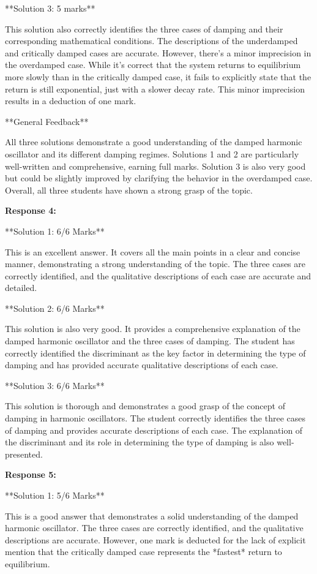 \documentclass[a4paper,11pt]{article}
\begin{document}
**Solution 3: 5 marks**

This solution also correctly identifies the three cases of damping and their corresponding mathematical conditions. The descriptions of the underdamped and critically damped cases are accurate. However, there's a minor imprecision in the overdamped case. While it's correct that the system returns to equilibrium more slowly than in the critically damped case, it fails to explicitly state that the return is still exponential, just with a slower decay rate. This minor imprecision results in a deduction of one mark.

**General Feedback**

All three solutions demonstrate a good understanding of the damped harmonic oscillator and its different damping regimes. Solutions 1 and 2 are particularly well-written and comprehensive, earning full marks. Solution 3 is also very good but could be slightly improved by clarifying the behavior in the overdamped case. Overall, all three students have shown a strong grasp of the topic.

\textbf{Response 4:}

**Solution 1: 6/6 Marks**

This is an excellent answer. It covers all the main points in a clear and concise manner, demonstrating a strong understanding of the topic. The three cases are correctly identified, and the qualitative descriptions of each case are accurate and detailed. 

**Solution 2: 6/6 Marks**

This solution is also very good. It provides a comprehensive explanation of the damped harmonic oscillator and the three cases of damping. The student has correctly identified the discriminant as the key factor in determining the type of damping and has provided accurate qualitative descriptions of each case.

**Solution 3: 6/6 Marks**

This solution is thorough and demonstrates a good grasp of the concept of damping in harmonic oscillators. The student correctly identifies the three cases of damping and provides accurate descriptions of each case. The explanation of the discriminant and its role in determining the type of damping is also well-presented.

\textbf{Response 5:}

**Solution 1: 5/6 Marks**

This is a good answer that demonstrates a solid understanding of the damped harmonic oscillator. The three cases are correctly identified, and the qualitative descriptions are accurate. However, one mark is deducted for the lack of explicit mention that the critically damped case represents the *fastest* return to equilibrium.
\end{document}
